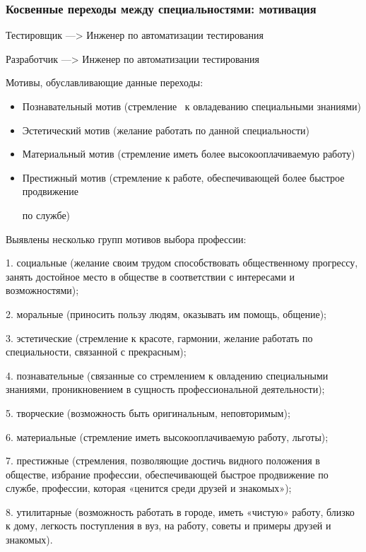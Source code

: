 \documentclass{../industrial-development}
\begin{document}
\begin{frame} \frametitle{Косвенные переходы между специальностями: мотивация }

 \begin{block}{Тестировщик --->  Инженер по автоматизации тестирования  

Разработчик --->  Инженер по автоматизации тестирования }
Мотивы, обуславливающие данные переходы:
  \end{block}
\begin{itemize}
\item Познавательный мотив (стремление ~к овладеванию специальными знаниями)
\item Эстетический мотив (желание работать по данной специальности)
\item Материальный мотив (стремление иметь более высокооплачиваемую работу) 
\item Престижный мотив (стремление к работе, обеспечивающей более быстрое продвижение 

по службе)
  \end{itemize}
\end{frame}

\lecturenotes

Выявлены несколько групп мотивов выбора профессии:

1. социальные (желание своим трудом способствовать общественному прогрессу, занять достойное место в обществе в соответствии с интересами и возможностями);

2. моральные (приносить пользу людям, оказывать им помощь, общение);

3. эстетические (стремление к красоте, гармонии, желание работать по специальности, связанной с прекрасным);

4. познавательные (связанные со стремлением к овладению специальными знаниями, проникновением в сущность профессиональной деятельности);

5. творческие (возможность быть оригинальным, неповторимым);

6. материальные (стремление иметь высокооплачиваемую работу, льготы);

7. престижные (стремления, позволяющие достичь видного положения в обществе, избрание профессии, обеспечивающей быстрое продвижение по службе, профессии, которая «ценится среди друзей и знакомых»);

8. утилитарные (возможность работать в городе, иметь «чистую» работу, близко к дому, легкость поступления в вуз, на работу, советы и примеры друзей и знакомых).
\end{document}
